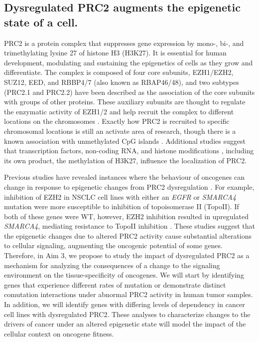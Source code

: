 \subsection*{Dysregulated PRC2 augments the epigenetic state of a cell.}

PRC2 is a protein complex that suppresses gene expression by mono-, bi-, and trimethylating lysine 27 of histone H3 (H3K27).
It is essential for human development, modulating and sustaining the epigenetics of cells as they grow and differentiate.
The complex is composed of four core subunits, EZH1/EZH2, SUZ12, EED, and RBBP4/7 (also known as RBAP46/48), and two subtypes (PRC2.1 and  PRC2.2) have been described as the association of the core subunits with groups of other proteins.
These auxiliary subunits are thought to regulate the enzymatic activity of EZH1/2 and help recruit the complex to different locations on the chromosomes \cite{VanMierlo2019a, Laugesen2019a}.
Exactly how PRC2 is recruited to specific chromosomal locations is still an activate area of research, though there is a known association with unmethylated CpG islands  \cite{Ku2008, Tanay2007HyperconservedSites., Mendenhall2010GC-richCells., Lynch2012AnRecruitment.}.
Additional studies suggest that transcription factors, non-coding RNA, and histone modifications \cite{Laugesen2019a}, including its own product, the methylation of H3K27, influence the localization of PRC2.

Previous studies have revealed instances where the behaviour of oncogenes can change in response to epigenetic changes from PRC2 dysregulation \cite{Kim2015SWI/SNF-mutantEZH2., Fillmore2015EZH2Inhibitors., Serresi2016PolycombCancer., Serresi2018Ezh2Vulnerabilities., Chen2018TargetingMedicine.}.
For example, inhibition of EZH2 in NSCLC cell lines with either an \emph{EGFR} or \emph{SMARCA4} mutation were more susceptible to inhibition of topoisomerase II (TopoII).
If both of these genes were WT, however, EZH2 inhibition resulted in upregulated \emph{SMARCA4}, mediating resistance to TopoII inhibition \cite{Fillmore2015EZH2Inhibitors.}.
These studies suggest that the epigenetic changes due to altered PRC2 activity cause substantial alterations to cellular signaling, augmenting the oncogenic potential of some genes.
Therefore, in Aim 3, we propose to study the impact of dysregulated PRC2 as a mechanism for analyzing the consequences of a change to the signaling environment on the tissue-specificity of oncogenes.
We will start by identifying genes that experience different rates of mutation or demonstrate distinct comutation interactions under abnormal PRC2 activity in human tumor samples.
In addition, we will identify genes with differing levels of dependency in cancer cell lines with dysregulated PRC2.
These analyses to characterize changes to the drivers of cancer under an altered epigenetic state will model the impact of the cellular context on oncogene fitness.
